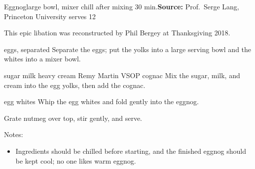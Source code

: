 \begin{recipe}{Eggnog}{large bowl, mixer \hfill chill after mixing \hfill 30 min.}{\textbf{Source:} Prof.\ Serge Lang, Princeton University \hfill serves 12}

 \freeform This epic libation was reconstructed by Phil Bergey at Thanksgiving 2018.

 \ing[12]{} {eggs, separated}
 Separate the eggs; put the yolks into a large serving bowl and the whites into a mixer bowl.

  {sugar}
  {milk}
  {heavy cream}
  {Remy Martin VSOP cognac}
 Mix the sugar, milk, and cream into the egg yolks, then add the cognac.

 \ing[12]{} {egg whites}
 Whip the egg whites and fold gently into the eggnog.

 Grate nutmeg over top, stir gently, and serve.

 \freeform Notes:
 \begin{itemize}
  \item Ingredients should be chilled before starting, and the finished eggnog should be kept cool; no one likes warm eggnog.
 \end{itemize}

\end{recipe}
